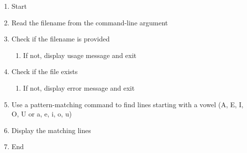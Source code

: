  \begin{enumerate}
    \item Start
    \item Read the filename from the command-line argument
    \item Check if the filename is provided
    \begin{enumerate}
        \item If not, display usage message and exit
    \end{enumerate}
    \item Check if the file exists
    \begin{enumerate}
        \item If not, display error message and exit
    \end{enumerate}
    \item Use a pattern-matching command to find lines starting with a vowel (A, E, I, O, U or a, e, i, o, u)
    \item Display the matching lines
    \item End
\end{enumerate}
